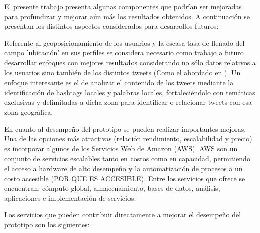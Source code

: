 El presente trabajo presenta algunas componentes que podrían ser mejoradas para profundizar y mejorar aún más los resultados obtenidos. A continuación se presentan los distintos aspectos considerados para desarrollos futuros:

Referente al geoposicionamiento de los usuarios y la escasa tasa de llenado del campo 'ubicación' en sus perfiles se considera necesario como trabajo a futuro desarrollar enfoques con mejores resultados considerando no sólo datos relativos a los usuarios sino también de los distintos tweets (Como el abordado en \cite{Cheng:2010:YYT:1871437.1871535} \cite{doi:10.1080/00330124.2014.907699} \cite{Dredze_carmen:a} \cite{GraellsGarridoP13}). Un enfoque interesante es el de analizar el contenido de los tweets mediante la identificación de hashtags locales y palabras locales, fortaleciéndolo con temáticas exclusivas y delimitadas a dicha zona para identificar o relacionar tweets con esa zona geográfica.

	En cuanto al desempeño del prototipo se pueden realizar importantes mejoras. Una de las opciones más atractivas (relación rendimiento, escalabilidad y precio) es incorporar algunos de los Servicios Web de Amazon (AWS). AWS son un conjunto de servicios escalables tanto en costos como en capacidad, permitiendo el acceso a hardware de alto desempeño y la automatización de procesos a un costo accesible (POR QUE ES ACCESIBLE). Entre los servicios que  ofrece se encuentran: cómputo global, almacenamiento, bases de datos, análisis, aplicaciones e implementación de servicios.
	
	Los servicios que pueden contribuir directamente a mejorar el desempeño del prototipo son los siguientes:
	
